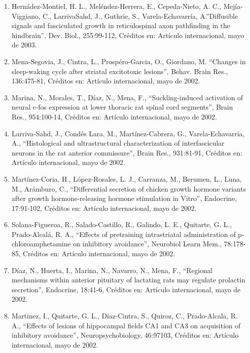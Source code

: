 \begin{enumerate}
\item Hernádez-Montiel, H. L., Meléndez-Herrera, E., Cepeda-Nieto, A. C., Mejía-Viggiano, C., LarrivaSahd, J., Guthrie, S., 
Varela-Echavarría, A.”Diffusible signals and fasciculated growth in reticulospinal axon pathfinding in the hindbrain”, Dev. 
Biol., 255:99-112, Créditos en: Artículo internacional, mayo de 2003.

\item Mena-Segovia, J., Cintra, L., Prospéro-Garcia, O., Giordano, M. “Changes in sleep-waking cycle after striatal 
excitotoxic lesions”, Behav. Brain Res., 136:475-81, Créditos en: Artículo internacional, mayo de 2002.

\item Marina, N., Morales, T., Díaz, N., Mena, F., “Suckling-induced activation of neural c-fos expression at lower 
thoracic 
rat spinal cord segments”, Brain Res., 954:100-14, Créditos en: Artículo internacional, mayo de 2002.

\item Larriva-Sahd, J., Condés Lara, M., Martínez-Cabrera, G., Varela-Echavarría, A., “Histological and ultrastructural 
characterization of interfascicular neurons in the rat anterior commissure”, Brain Res., 931:81-91, Créditos en: Artículo 
internacional, mayo de 2002.

\item Martínez-Coria, H., López-Rosales, L. J., Carranza, M., Berumen, L., Luna, M., Arámburo, C., “Differential secretion 
of 
chicken growth hormone variants after growth hormone-releasing hormone stimulation in Vitro”, Endocrine, 17:91-102, 
Créditos en: Artículo internacional, mayo de 2002.

\item Solana-Figueroa, R., Salado-Castillo, R., Galindo, L. E., Quitarte, G. L., Prado-Alcalá, R. A., “Effects of 
pretraining 
intrastriatal administration of p-chloroamphetamine on inhibitory avoidance”, Neurobiol Learn Mem., 78:178-85, Créditos en: 
Artículo internacional, mayo de 2002.

\item Díaz, N., Huerta, I., Marina, N., Navarro, N., Mena, F., “Regional mechanisms within anterior pituitary of lactating 
rats may regulate prolactin secretion”, Endocrine, 18:41-6, Créditos en: Artículo internacional, mayo de 2002.

\item Martinez, I., Quitarte, G. L., Díaz-Cintra, S., Quiroz, C., Prado-Alcala, R. A., “Effects of lesions of hippocampal 
fields CA1 and CA3 on acquisition of inhibitory avoidance”, Neuropsychobiology, 46:97103, Créditos en: Artículo 
internacional, mayo de 2002.


\end{enumerate}
